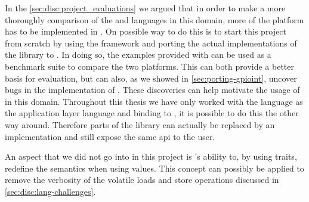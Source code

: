 In the \autoref{sec:disc:project_evaluations} we argued that in order to make a more thoroughly comparison of the {\C} and {\rust} languages in this domain, more of the platform has to be implemented in {\rust}.
On possible way to do this is to start this project from scratch by using the  framework and porting the actual implementations of the {\emlib} library to {\rust}.
In doing so, the examples provided with {\emlib} can be used as a benchmark suite to compare the two platforms.
This can both provide a better basis for evaluation, but can also, as we showed in \autoref{sec:porting-gpioint}, uncover bugs in the {\C} implementation of {\emlib}.
These discoveries can help motivate the usage of {\rust} in this domain.
Throughout this thesis we have only worked with the {\rust} language as the application layer language and binding to {\C}, it is possible to do this the other way around.
Therefore parts of the {\emlib} library can actually be replaced by an {\rust} implementation and still expose the same \gls{api} to the user.

An aspect that we did not go into in this project is {\rust}'s ability to, by using traits, redefine the semantics when using values.
This concept can possibly be applied to remove the verbosity of the volatile loads and store operations discussed in \autoref{sec:disc:lang-challenges}.
